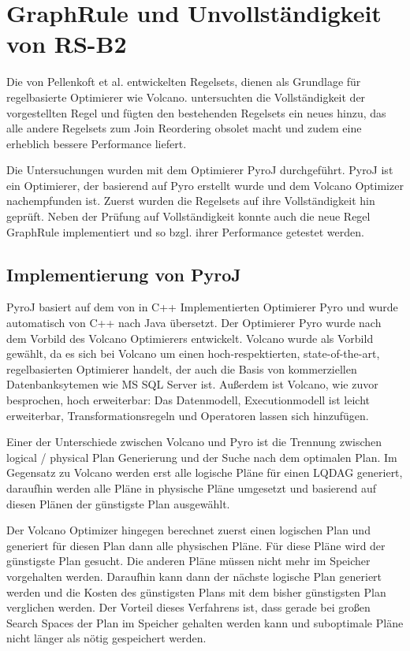 \section{GraphRule und Unvollständigkeit von RS-B2}

Die von Pellenkoft et al. entwickelten Regelsets, dienen als Grundlage für regelbasierte Optimierer wie Volcano. \cite{shanbhag2014optimizing} untersuchten die Vollständigkeit der vorgestellten Regel und fügten den bestehenden Regelsets ein neues hinzu, das alle andere Regelsets zum Join Reordering obsolet macht und zudem eine erheblich bessere Performance liefert.

Die Untersuchungen \cite{shanbhag2014optimizing} wurden mit dem Optimierer PyroJ durchgeführt. PyroJ ist ein Optimierer, der basierend auf Pyro \cite{roy2001multi} erstellt wurde und dem Volcano Optimizer nachempfunden ist. Zuerst wurden die Regelsets auf ihre Vollständigkeit hin geprüft. Neben der Prüfung auf Vollständigkeit konnte auch die neue Regel GraphRule implementiert und so bzgl. ihrer Performance getestet werden.



\subsection{Implementierung von PyroJ}

PyroJ basiert auf dem von \cite{roy2001multi} in C++ Implementierten Optimierer Pyro und wurde automatisch von C++ nach Java übersetzt. Der Optimierer Pyro wurde nach dem Vorbild des Volcano Optimierers entwickelt. Volcano wurde als Vorbild gewählt, da es sich bei Volcano um einen hoch-respektierten, state-of-the-art, regelbasierten Optimierer handelt, der auch die Basis von kommerziellen Datenbanksytemen wie MS SQL Server ist. Außerdem ist Volcano, wie zuvor besprochen, hoch erweiterbar: Das Datenmodell, Executionmodell ist leicht erweiterbar, Transformationsregeln und Operatoren lassen sich hinzufügen. 

Einer der Unterschiede zwischen Volcano und Pyro ist die Trennung zwischen logical / physical Plan Generierung und der Suche nach dem optimalen Plan. Im Gegensatz zu Volcano werden erst alle logische Pläne für einen \ac{LQDAG} generiert, daraufhin werden alle Pläne in physische Pläne umgesetzt und basierend auf diesen Plänen der günstigste Plan ausgewählt.

Der Volcano Optimizer hingegen berechnet zuerst einen logischen Plan und generiert für diesen Plan dann alle physischen Pläne. Für diese Pläne wird der günstigste Plan gesucht. Die anderen Pläne müssen nicht mehr im Speicher vorgehalten werden. Daraufhin kann dann der nächste logische Plan generiert werden und die Kosten des günstigsten Plans mit dem bisher günstigsten Plan verglichen werden. Der Vorteil dieses Verfahrens ist, dass gerade bei großen Search Spaces der Plan im Speicher gehalten werden kann und suboptimale Pläne nicht länger als nötig gespeichert werden.

